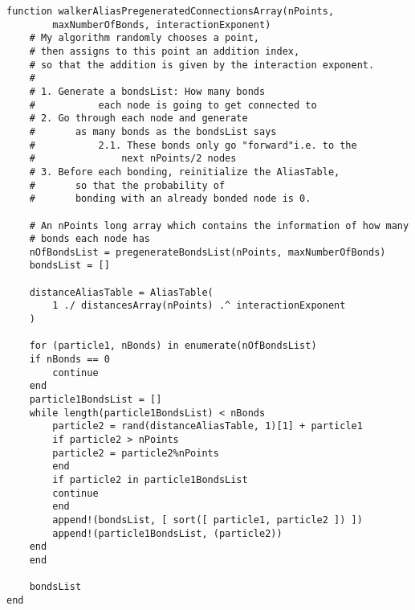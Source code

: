 \begin{lstlisting}
function walkerAliasPregeneratedConnectionsArray(nPoints,
		maxNumberOfBonds, interactionExponent)
    # My algorithm randomly chooses a point, 
    # then assigns to this point an addition index,
    # so that the addition is given by the interaction exponent.
    #
    # 1. Generate a bondsList: How many bonds 
    #       	each node is going to get connected to
    # 2. Go through each node and generate 
    # 		as many bonds as the bondsList says
    #           2.1. These bonds only go "forward"i.e. to the 
    #           	next nPoints/2 nodes
    # 3. Before each bonding, reinitialize the AliasTable,
    # 		so that the probability of 
    # 		bonding with an already bonded node is 0.

    # An nPoints long array which contains the information of how many
    # bonds each node has
    nOfBondsList = pregenerateBondsList(nPoints, maxNumberOfBonds)
    bondsList = []

    distanceAliasTable = AliasTable(
    	1 ./ distancesArray(nPoints) .^ interactionExponent
    )

    for (particle1, nBonds) in enumerate(nOfBondsList)
	if nBonds == 0
	    continue
	end
	particle1BondsList = []
	while length(particle1BondsList) < nBonds
	    particle2 = rand(distanceAliasTable, 1)[1] + particle1
	    if particle2 > nPoints
		particle2 = particle2%nPoints
	    end
	    if particle2 in particle1BondsList
		continue
	    end
	    append!(bondsList, [ sort([ particle1, particle2 ]) ])
	    append!(particle1BondsList, (particle2))
	end
    end

    bondsList
end

\end{lstlisting}

